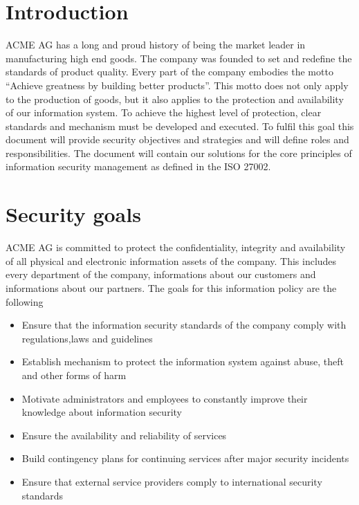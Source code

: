 \chapter{Introduction}
ACME AG has a long and proud history of being the market leader in manufacturing high end goods. The company was founded to set and redefine the standards of product quality. Every part of the company embodies the motto “Achieve greatness by building better products”. This motto does not only apply to the production of goods, but it also applies to the protection and availability of our information system. 
\newline
\newline
To achieve the highest level of protection, clear standards and mechanism must be developed and executed. To fulfil this goal this document will provide security objectives and strategies and will define roles and responsibilities.
\newline
\newline
The document will contain our solutions for the core principles of information security management as defined in the ISO 27002.



\chapter{Security goals}
ACME AG is committed to protect the confidentiality, integrity and availability of all physical and electronic information assets of the company. This includes every department of the company, informations about our customers and informations about our partners. The goals for this information policy are the following\cite{Host}
\begin{itemize}
\item Ensure that the information security standards of the company comply with regulations,laws and guidelines
\item Establish mechanism to protect the information system against abuse, theft and other forms of harm
\item Motivate administrators and employees to constantly improve their knowledge about information security 
\item Ensure the availability and reliability of services
\item Build contingency plans for continuing services after major security incidents
\item Ensure that external service providers comply to international security standards
\end{itemize}
